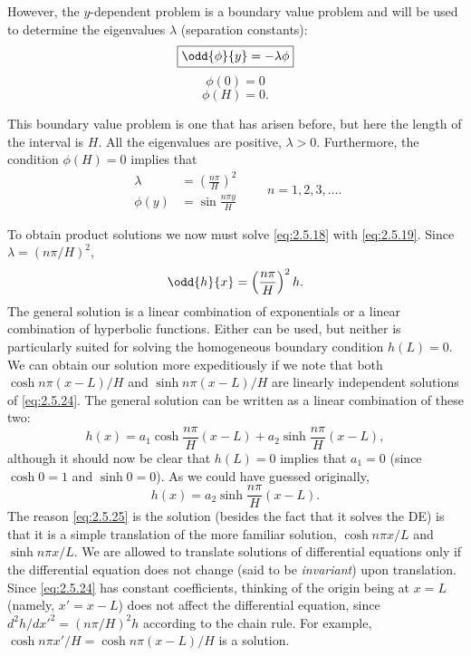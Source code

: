 However, the $y$-dependent problem is a boundary value problem and will be used to determine the eigenvalues $\lambda$ (separation constants):
\begin{equation}
\label{eq:2.5.20}
\boxed{\odd{\phi}{y} = -\lambda\phi}
\end{equation}
\begin{equation}
\label{eq:2.5.21}
\boxed{\phi(0) = 0}
\end{equation}
\begin{equation}
\label{eq:2.5.22}
\boxed{\phi(H) = 0.}
\end{equation}

This boundary value problem is one that has arisen before, but here the length of the interval is $H$. All the eigenvalues are positive, $\lambda > 0$. Furthermore, the condition $\phi(H) = 0$ implies that
\begin{equation}
\label{eq:2.5.23}
\boxed{\begin{aligned}
\lambda &= \left(\frac{n\pi}{H}\right)^2 \\[4pt]
\phi(y) &= \sin\frac{n\pi y}{H}
\end{aligned}}
\qquad n = 1, 2, 3, \ldots.
\end{equation}

To obtain product solutions we now must solve \eqref{eq:2.5.18} with \eqref{eq:2.5.19}. Since $\lambda = (n\pi/H)^2$,
\begin{equation}
\label{eq:2.5.24}
\odd{h}{x} = \left(\frac{n\pi}{H}\right)^2 h.
\end{equation}
The general solution is a linear combination of exponentials or a linear combination of hyperbolic functions. Either can be used, but neither is particularly suited for solving the homogeneous boundary condition $h(L) = 0$. We can obtain our solution more expeditiously if we note that both $\cosh n\pi(x-L)/H$ and $\sinh n\pi(x-L)/H$ are linearly independent solutions of \eqref{eq:2.5.24}. The general solution can be written as a linear combination of these two:
\begin{equation}
\label{eq:2.5.25}
h(x) = a_1\cosh\frac{n\pi}{H}(x-L) + a_2\sinh\frac{n\pi}{H}(x-L),
\end{equation}
although it should now be clear that $h(L) = 0$ implies that $a_1 = 0$ (since $\cosh 0 = 1$ and $\sinh 0 = 0$). As we could have guessed originally,
\begin{equation}
\label{eq:2.5.26}
h(x) = a_2\sinh\frac{n\pi}{H}(x-L).
\end{equation}
The reason \eqref{eq:2.5.25} is the solution (besides the fact that it solves the DE) is that it is a simple translation of the more familiar solution, $\cosh n\pi x/L$ and $\sinh n\pi x/L$. We are allowed to translate solutions of differential equations only if the differential equation does not change (said to be \emph{invariant}) upon translation. Since \eqref{eq:2.5.24} has constant coefficients, thinking of the origin being at $x = L$ (namely, $x' = x - L$) does not affect the differential equation, since $d^2h/dx'^2 = (n\pi/H)^2 h$ according to the chain rule. For example, $\cosh n\pi x'/H = \cosh n\pi(x-L)/H$ is a solution.

